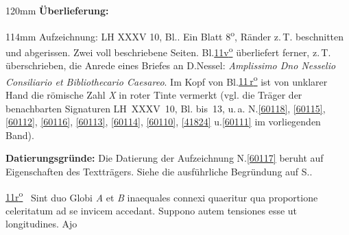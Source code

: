 %
\frenchspacing%
\begin{ledgroupsized}[r]{120mm}%
\footnotesize%
\pstart%
\noindent\textbf{Überlieferung:}
\pend%
\end{ledgroupsized}%
\begin{ledgroupsized}[r]{114mm}%
\footnotesize%
\pstart%
\parindent -6mm%
%
Aufzeichnung:
LH XXXV 10, Bl..
Ein Blatt 8\textsuperscript{o},
Ränder z.\,T. beschnitten und abgerissen.
Zwei voll beschriebene Seiten.
Bl.\;\href{\Scan{LH_35_10_14_011v}}{11\:v\textsuperscript{o}} überliefert ferner, z.\,T. überschrieben, die Anrede eines Briefes an D.\;Nessel:
\textit{Amplissimo Dno Nesselio Consiliario et Bibliothecario Caesareo}. %
Im Kopf von Bl.\;\href{\Scan{LH_35_10_14_011r}}{11\,r\textsuperscript{o}} ist von unklarer Hand die römische Zahl \textit{X} in roter Tinte vermerkt
(vgl. die Träger der benachbarten Signaturen LH~XXXV~10, Bl. bis~13,
u.\,a. 
N.\;\ref{60118},
\ref{60115},
\ref{60112},
\ref{60116},
\ref{60113},
\ref{60114},
\ref{60110},
\ref{41824}
u.\;\ref{60111}
im vorliegenden Band).
\pend%
\end{ledgroupsized}%
\vspace{5mm}%
\begin{ledgroup}%
\footnotesize%
\pstart%
\noindent%
\textbf{Datierungsgründe:}
Die Datierung der Aufzeichnung N.\;\ref{60117} beruht auf Eigenschaften des Textträgers.
Siehe die ausführliche Begründung auf S.\;\pageref{60117_dat}.%
\pend%
\end{ledgroup}%
%
\frenchspacing%
\vspace{5mm}%
\normalsize%
\pstart%
\noindent%
\lbrack%
\href{\Scan{LH_35_10_14_011r}}%
{11\:r\textsuperscript{o}}%
\rbrack\
Sint duo Globi
\textit{A} et \textit{B}
inaequales connexi%
quaeritur
qua proportione celeritatum%
ad se invicem accedant.
Suppono autem
tensiones esse%
ut longitudines.
Ajo
